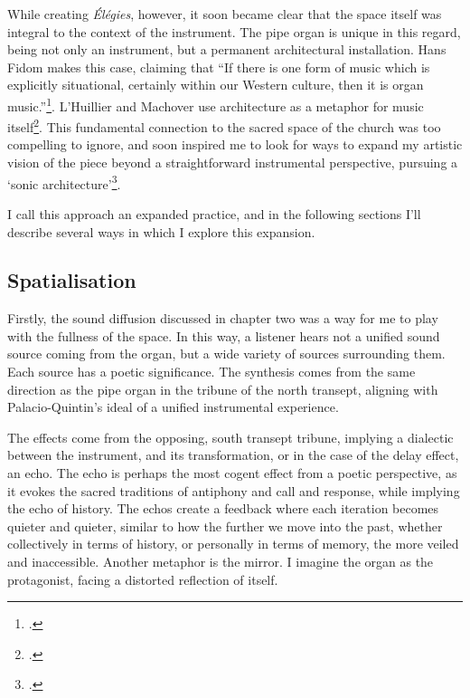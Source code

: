 \documentclass[12pt,twoside,maitrise]{dms_ks}
\theoremstyle{definition}
\begin{document}
{While creating \textit{Élégies}, however, it soon became clear that the space itself was integral to the context of the instrument. 
The pipe organ is unique in this regard, being not only an instrument, but a permanent architectural installation. 
Hans Fidom makes this case, claiming that “If there is one form of music which is explicitly situational, certainly within our Western culture, then it is organ music.”\footcite[23]{fidom_music_2011}. 
L'Huillier and Machover use architecture as a metaphor for music itself\footcite[361]{lhuillier_spaces_2018}. 
This fundamental connection to the sacred space of the church was too compelling to ignore, and soon inspired me to look for ways to expand my artistic vision of the piece beyond a straightforward instrumental perspective, pursuing a `sonic architecture'\footcite[“Sonic architectures are intentionally designed architectural soundscapes that create the conditions for the emergence of a building’s Voice.”][2]{lacey_site-specific_2014}.

I call this approach an expanded practice, and in the following sections I'll describe several ways in which I explore this expansion.

\subsection{Spatialisation}

Firstly, the sound diffusion discussed in chapter two was a way for me to play with the fullness of the space. 
In this way, a listener hears not a unified sound source coming from the organ, but a wide variety of sources surrounding them. 
Each source has a poetic significance. 
The synthesis comes from the same direction as the pipe organ in the tribune of the north transept, aligning with Palacio-Quintin's ideal of a unified instrumental experience.

The effects come from the opposing, south transept tribune, implying a dialectic between the instrument, and its transformation, or in the case of the delay effect, an echo. 
The echo is perhaps the most cogent effect from a poetic perspective, as it evokes the sacred traditions of antiphony and call and response, while implying the echo of history. 
The echos create a feedback where each iteration becomes quieter and quieter, similar to how the further we move into the past, whether collectively in terms of history, or personally in terms of memory, the more veiled and inaccessible. 
Another metaphor is the mirror. 
I imagine the organ as the protagonist, facing a distorted reflection of itself.

}
\end{document}
